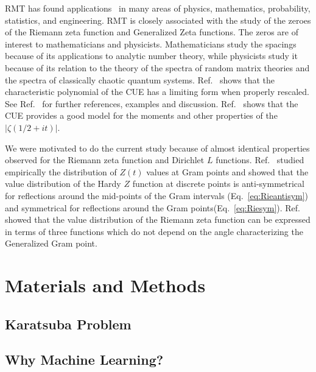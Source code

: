 \documentclass[twoside]{article}
\begin{document}
RMT has found applications~\cite{KeatingSnaith 2000,Odlyzko 1992} 
in many areas of physics, mathematics,  probability, statistics, and engineering. 
 RMT is closely associated with the study of the zeroes of the Riemann zeta function 
 and Generalized Zeta functions. The zeros are of interest to mathematicians and physicists. 
Mathematicians 
study the spacings because of its applications to analytic number theory, 
while physicists study it because of its  relation 
to the theory of the spectra of random matrix theories 
and the spectra of classically chaotic quantum systems.
Ref.~\cite{Chhaibi 2014} shows that the characteristic polynomial 
of the CUE has a limiting form when properly rescaled. 
See Ref.~\cite{Francesco 2007,os6, Hanga 2020} for  further references,
examples and discussion. 
 Ref.~\cite{KeatingSnaith 2000} shows that the CUE provides
a good model for the moments and other properties of the $|\zeta(1/2 + it)|$.

We were motivated to do the current study because of almost identical 
properties observed
for the Riemann zeta function and Dirichlet $L$ functions. 
Ref.~\cite{Shanker 2018a,Shanker 2018b} studied empirically 
the distribution of $Z(t)$ values 
at Gram points and showed  that  the  value
distribution of the Hardy $Z$ function at discrete points is anti-symmetrical for 
reflections around the mid-points of the Gram intervals (Eq.~\ref{eq:Rieantisym}) 
and symmetrical for reflections around the Gram points(Eq.~\ref{eq:Riesym}). 
Ref.~\cite{Shanker 2020} showed that the value distribution of the Riemann zeta function 
can be expressed in terms of three  functions 
 which do not depend on the angle characterizing the Generalized Gram point. 




\section{\label{sec2}Materials and Methods}

\subsection{\label{seckaratsuba}Karatsuba Problem}


\subsection{\label{secwhy}Why Machine Learning?}
\end{document}
